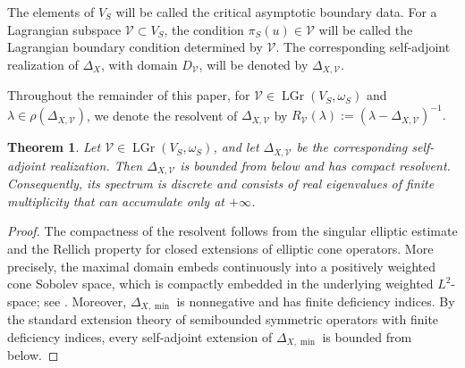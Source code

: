 \documentclass[12pt]{amsart}
\theoremstyle{plain}
\newtheorem{thm}{Theorem}[section]
\theoremstyle{definition}
\theoremstyle{remark}
\numberwithin{equation}{section} \numberwithin{figure}{section}
\begin{document}
The elements of \(V_S\) will be called the critical asymptotic
boundary data. For a Lagrangian subspace
\(\mathcal V\subset V_S\), the condition
\(\pi_S(u)\in\mathcal V\) will be called the Lagrangian boundary
condition determined by \(\mathcal V\). The corresponding
self-adjoint realization of \(\Delta_X\), with domain
\(D_{\mathcal V}\), will be denoted by
\(\Delta_{X,\mathcal V}\).

Throughout the remainder of this paper, for
\(\mathcal V\in\operatorname{LGr}(V_S,\omega_S)\) and
\(\lambda\in\rho(\Delta_{X,\mathcal V})\), we denote the resolvent of
\(\Delta_{X,\mathcal V}\) by
\(
    R_{\mathcal V}(\lambda)
    :=
    (\lambda-\Delta_{X,\mathcal V})^{-1}.
\)


\begin{thm}\label{thm:compact-resolvent}
Let
\(\mathcal V\in\operatorname{LGr}(V_S,\omega_S)\), and let
\(\Delta_{X,\mathcal V}\) be the corresponding self-adjoint
realization. Then \(\Delta_{X,\mathcal V}\) is bounded from below and
has compact resolvent. Consequently, its spectrum is discrete and
consists of real eigenvalues of finite multiplicity that can
accumulate only at \(+\infty\).
\end{thm}

\begin{proof}
The compactness of the resolvent follows from the singular elliptic
estimate and the Rellich property for closed extensions of elliptic
cone operators. More precisely, the maximal domain embeds continuously
into a positively weighted cone Sobolev space, which is compactly
embedded in the underlying weighted \(L^2\)-space; see
\cite[Lemma~3.9 and (3.10)]{gjb}. Moreover,
\(\Delta_{X,\min}\) is nonnegative and has finite deficiency indices.
By the standard extension theory of semibounded symmetric operators
with finite deficiency indices, every self-adjoint extension of
\(\Delta_{X,\min}\) is bounded from below.
\end{proof}
\end{document}
